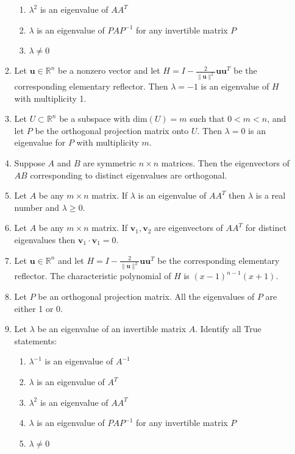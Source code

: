 \begin{enumerate}[leftmargin=*]
\begin{enumerate}
\begin{enumerate}
\item $ \lambda^2 $ is an eigenvalue of $ AA^T $
\item $ \lambda $ is an eigenvalue of $ PAP^{-1} $ for any invertible matrix $ P $
\item $ \lambda \not= 0 $
\end{enumerate}
\item Let $ \boldsymbol{u} \in \mathbb{R}^n $ be a nonzero vector and let $ H = I - \frac{2}{\| \boldsymbol{u} \|^2} \boldsymbol{u} \boldsymbol{u}^T $ be the corresponding elementary reflector. Then $\lambda = -1$ is an eigenvalue of $H$ with multiplicity 1.
\item Let $ U \subset \mathbb{R}^n $ be a subspace with $ \mathrm{dim}(U) = m $ such that $ 0 < m < n$, and let $ P $ be the orthogonal projection matrix onto $ U $. Then $ \lambda = 0 $ is an eigenvalue for $ P $ with multiplicity $ m $.
\item Suppose $A$ and $B$ are symmetric $n \times n$ matrices. Then the eigenvectors of $AB$ corresponding to distinct eigenvalues are orthogonal.
\item Let $ A $ be any $ m \times n $ matrix. If $ \lambda $ is an eigenvalue of $ AA^T $ then $ \lambda $ is a real number and $ \lambda \geq 0 $.
\item Let $ A $ be any $ m \times n $ matrix. If $ \boldsymbol{v}_1 , \boldsymbol{v}_2 $ are eigenvectors of $ AA^T $ for distinct eigenvalues then $ \boldsymbol{v}_1 \cdot \boldsymbol{v}_1 = 0 $.
\item Let $ \boldsymbol{u} \in \mathbb{R}^n $ and let $ H = I - \frac{2}{\| \boldsymbol{u} \|^2} \boldsymbol{u} \boldsymbol{u}^T $ be the corresponding elementary reflector. The characteristic polynomial of $ H $ is $ (x-1)^{n-1}(x+1)$.
\item Let $ P $ be an orthogonal projection matrix. All the eigenvalues of $ P $ are either 1 or 0.
\item Let $ \lambda $ be an eigenvalue of an invertible matrix $ A $. Identify all True statements:
\begin{enumerate}
\item $ \lambda^{-1} $ is an eigenvalue of $ A^{-1} $
\item $ \lambda $ is an eigenvalue of $ A^T $
\item $ \lambda^2 $ is an eigenvalue of $ AA^T $
\item $ \lambda $ is an eigenvalue of $ PAP^{-1} $ for any invertible matrix $ P $
\item $ \lambda \not= 0 $
\end{enumerate}

\end{enumerate}
\end{enumerate}
